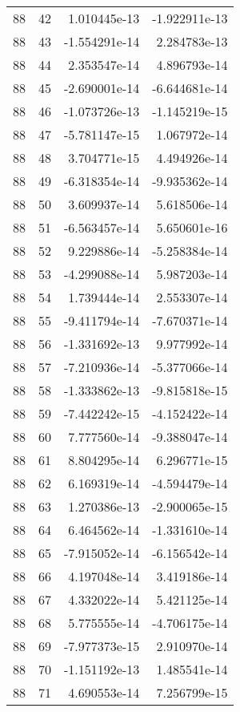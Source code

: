 \begin{tabular}{rrrr}
  88 &   42 &  1.010445e-13 & -1.922911e-13 \\
  88 &   43 & -1.554291e-14 &  2.284783e-13 \\
  88 &   44 &  2.353547e-14 &  4.896793e-14 \\
  88 &   45 & -2.690001e-14 & -6.644681e-14 \\
  88 &   46 & -1.073726e-13 & -1.145219e-15 \\
  88 &   47 & -5.781147e-15 &  1.067972e-14 \\
  88 &   48 &  3.704771e-15 &  4.494926e-14 \\
  88 &   49 & -6.318354e-14 & -9.935362e-14 \\
  88 &   50 &  3.609937e-14 &  5.618506e-14 \\
  88 &   51 & -6.563457e-14 &  5.650601e-16 \\
  88 &   52 &  9.229886e-14 & -5.258384e-14 \\
  88 &   53 & -4.299088e-14 &  5.987203e-14 \\
  88 &   54 &  1.739444e-14 &  2.553307e-14 \\
  88 &   55 & -9.411794e-14 & -7.670371e-14 \\
  88 &   56 & -1.331692e-13 &  9.977992e-14 \\
  88 &   57 & -7.210936e-14 & -5.377066e-14 \\
  88 &   58 & -1.333862e-13 & -9.815818e-15 \\
  88 &   59 & -7.442242e-15 & -4.152422e-14 \\
  88 &   60 &  7.777560e-14 & -9.388047e-14 \\
  88 &   61 &  8.804295e-14 &  6.296771e-15 \\
  88 &   62 &  6.169319e-14 & -4.594479e-14 \\
  88 &   63 &  1.270386e-13 & -2.900065e-15 \\
  88 &   64 &  6.464562e-14 & -1.331610e-14 \\
  88 &   65 & -7.915052e-14 & -6.156542e-14 \\
  88 &   66 &  4.197048e-14 &  3.419186e-14 \\
  88 &   67 &  4.332022e-14 &  5.421125e-14 \\
  88 &   68 &  5.775555e-14 & -4.706175e-14 \\
  88 &   69 & -7.977373e-15 &  2.910970e-14 \\
  88 &   70 & -1.151192e-13 &  1.485541e-14 \\
  88 &   71 &  4.690553e-14 &  7.256799e-15 \\

\end{tabular}
